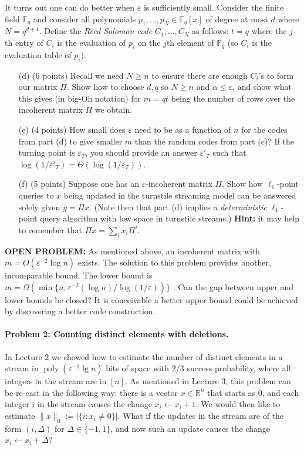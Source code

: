 \documentclass[12pt]{article}
\newcommand{\eps}{\varepsilon}
\newcommand{\R}{\mathbb{R}}
\begin{document}
It turns out one can do better when $\eps$ is sufficiently small. Consider the finite field $\mathbb{F}_q$ and consider all polynomials $p_1,\ldots,p_N\in \mathbb{F}_q[x]$ of degree at most $d$ where $N = q^{d+1}$. Define the {\em Reed-Solomon code} $C_1,\ldots,C_N$ as follows: $t = q$ where the $j$th entry of $C_i$ is the evaluation of $p_i$ on the $j$th element of $\mathbb{F}_q$ (so $C_i$ is the evaluation table of $p_i$).

\begin{itemize}
\item[(d)] (6 points) Recall we need $N \ge n$ to ensure there are enough $C_i$'s to form our matrix $\Pi$. Show how to choose $d,q$ so $N \ge n$ and $\alpha \le \eps$, and show what this gives (in big-Oh notation) for $m = qt$ being the number of rows over the incoherent matrix $\Pi$ we obtain.
\item[(e)] (4 points) How small does $\eps$ need to be as a function of $n$ for the codes from part (d) to give smaller $m$ than the random codes from part (c)? If the turning point is $\eps_T$, you should provide an answer $\eps'_T$ such that $\log(1/\eps'_T) = \Theta(\log(1/\eps_T))$.
\item[(f)] (5 points) Suppose one has an $\eps$-incoherent matrix $\Pi$. Show how $\ell_1$-point queries to $x$ being updated in the turnstile streaming model can be answered solely given $y = \Pi x$. (Note then that part (d) implies a {\em deterministic} $\ell_1$-point query algorithm with low space in turnstile streams.) \textbf{Hint:} it may  help to remember that $\Pi x = \sum_i x_i \Pi^i$.
\end{itemize}

\noindent \textbf{OPEN PROBLEM:} As mentioned above, an incoherent matrix with $m = O(\eps^{-2}\log n)$ exists. The solution to this problem provides another, incomparable bound. The lower bound is $m = \Omega(\min\{n, \eps^{-2}(\log n)/\log(1/\eps))\}$ \cite[Section 9]{Alon03}. Can the gap between upper and lower bounds be closed? It is conceivable a better upper bound could be achieved by discovering a better code construction.

\paragraph{Problem 2: Counting distinct elements with deletions.}  In Lecture 2 we showed how to estimate the number of distinct elements in a stream in $\mathop{poly}(\eps^{-1}\lg n)$ bits of space with $2/3$ success probability, where all integers in the stream are in $[n]$. As mentioned in Lecture 3, this problem can be re-cast in the following way: there is a vector $x\in\R^n$ that starts as $0$, and each integer $i$ in the stream causes the change $x_i \leftarrow x_i + 1$. We would then like to estimate $\|x\|_0 := |\{i : x_i\neq 0\}|$. What if the updates in the stream are of the form $(i,\Delta)$ for $\Delta\in\{-1,1\}$, and now such an update causes the change $x_i\leftarrow x_i + \Delta$?
\end{document}
